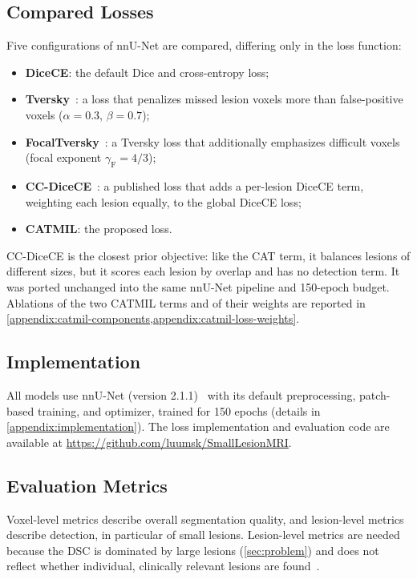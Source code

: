 \subsection{Compared Losses}

Five configurations of nnU-Net are compared, differing only in the loss
function:
\begin{itemize}
    \item \textbf{DiceCE}: the default Dice and cross-entropy loss;
    \item \textbf{Tversky}~\cite{salehi_tversky_2017}: a loss that
    penalizes missed lesion voxels more than false-positive voxels
    ($\alpha=0.3$, $\beta=0.7$);
    \item \textbf{FocalTversky}~\cite{abraham_novel_2019}: a Tversky loss
    that additionally emphasizes difficult voxels (focal exponent
    $\gamma_{\mathrm{F}}=4/3$);
    \item \textbf{CC-DiceCE}~\cite{bouteille_learning_2026}: a published
    loss that adds a per-lesion DiceCE term, weighting each lesion equally,
    to the global DiceCE loss;
    \item \textbf{CATMIL}: the proposed loss.
\end{itemize}
CC-DiceCE is the closest prior objective: like the CAT term, it balances
lesions of different sizes, but it scores each lesion by overlap and has no
detection term. It was ported unchanged into the same nnU-Net pipeline and
150-epoch budget. Ablations of the two CATMIL terms and of their weights
are reported in
\cref{appendix:catmil-components,appendix:catmil-loss-weights}.

\subsection{Implementation}

All models use nnU-Net (version 2.1.1)~\cite{isensee_nnu-net_2021} with
its default preprocessing, patch-based training, and optimizer, trained for
150 epochs (details in \cref{appendix:implementation}). The loss
implementation and evaluation code are available at
\url{https://github.com/luumsk/SmallLesionMRI}.

\subsection{Evaluation Metrics}

Voxel-level metrics describe overall segmentation quality, and lesion-level
metrics describe detection, in particular of small lesions. Lesion-level
metrics are needed because the DSC is dominated by large lesions
(\cref{sec:problem}) and does not reflect whether individual, clinically
relevant lesions are found~\cite{basit_rethinking_2026,jaus_every_2025}.

